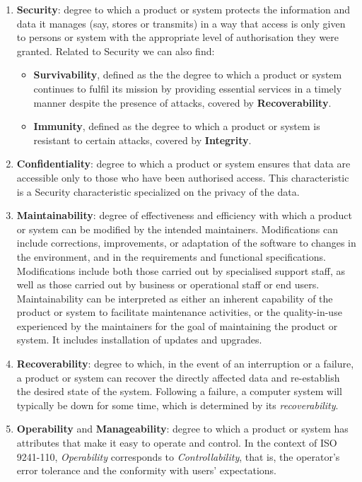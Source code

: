 \begin{enumerate}
    \item \textbf{Security}: degree to which a product or system protects the information and data it manages (say, stores or transmits) in a way that access is only given to persons or system with the appropriate level of authorisation they were granted.
    Related to Security we can also find:
    \begin{itemize}
        \item \textbf{Survivability}, defined as the the degree to which a product or system continues to fulfil its mission by providing essential services in a timely manner despite the presence of attacks, covered by \textbf{Recoverability}.
        \item \textbf{Immunity}, defined as the degree to which a product or system is resistant to certain attacks, covered by \textbf{Integrity}.
    \end{itemize}
    
    \item \textbf{Confidentiality}: degree to which a product or system ensures that data are accessible only to those who have been authorised access. This characteristic is a Security characteristic specialized on the privacy of the data.

    \item \textbf{Maintainability}: degree of effectiveness and efficiency with which a product or system can be modified by the intended maintainers. Modifications can include corrections, improvements, or adaptation of the software to changes in the environment, and in the requirements and functional specifications. Modifications include both those carried out by specialised support staff, as well as those carried out by business or operational staff or end users. Maintainability can be interpreted as either an inherent capability of the product or system to facilitate maintenance activities, or the quality-in-use experienced by the maintainers for the goal of maintaining the product or system. It includes installation of updates and upgrades. 

    \item \textbf{Recoverability}: degree to which, in the event of an interruption or a failure, a product or system can recover the directly affected data and re-establish the desired state of the system. Following a failure, a computer system will typically be down for some time, which is determined by its \textit{recoverability}.

    \item \textbf{Operability} and \textbf{Manageability}: degree to which a product or system has attributes that make it easy to operate and control. In the context of ISO 9241-110, \textit{Operability} corresponds to \textit{Controllability}, that is, the operator's error tolerance and the conformity with users' expectations.


\end{enumerate}
